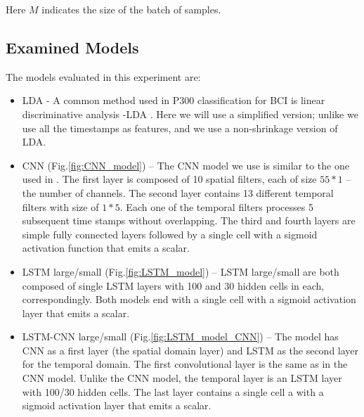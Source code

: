 \documentclass[
12pt, %
english, %
doublespacing, %
headsepline, %
]{MastersDoctoralThesis} %
\begin{document}
Here $M$ indicates the size of the batch of samples.


\subsection{Examined Models}
The models evaluated in this experiment are:
\begin{itemize}
	\item LDA - A common method used in P300 classification for BCI is linear discriminative analysis -LDA \cite{BlaknertzExperiment,P300_Tutorial}. Here we will use a simplified version; unlike \cite{BlaknertzExperiment} we use all the timestamps as features, and we use a non-shrinkage version of LDA.
	
	\item CNN (Fig.\ref{fig:CNN_model}) -- The CNN model we use is similar to the one used in \cite{P300_CNN}. The first layer is composed of 10  spatial filters, each of size $55*1$ -- the number of channels. The second layer contains 13 different temporal filters with size of $1*5$. Each one of the temporal filters processes 5 subsequent time stamps without overlapping. The third and fourth layers are simple fully connected layers followed by a single cell with a sigmoid activation function that emits a scalar.
	
	\item LSTM large/small (Fig.\ref{fig:LSTM_model}) -- LSTM large/small are both composed of single LSTM layers with 100 and 30 hidden cells in each, correspondingly. Both models end with a single cell with a sigmoid activation layer that emits a scalar.
	
	\item LSTM-CNN large/small (Fig.\ref{fig:LSTM_model_CNN}) -- The model has CNN as a first layer (the spatial domain layer) and LSTM as the second layer for the temporal domain. The first convolutional layer is the same as in the CNN model. Unlike the CNN model, the temporal layer is an LSTM layer with 100/30 hidden cells. The last layer contains a single cell a with a sigmoid activation layer that emits a scalar.

\end{itemize}
\end{document}

